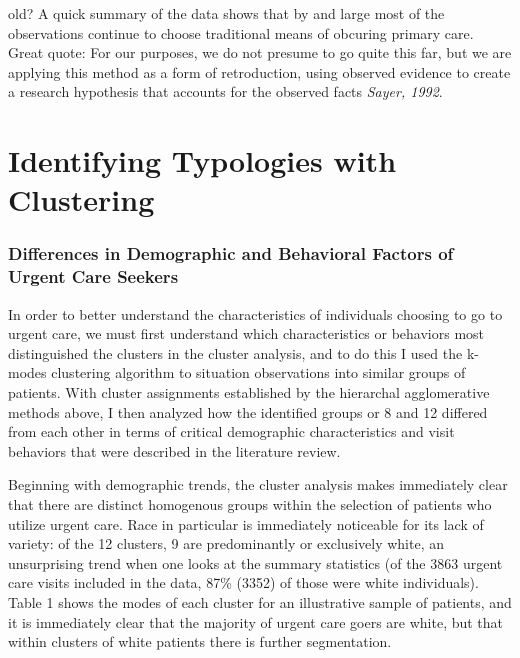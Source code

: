 \documentclass[12pt,twoside]{reedthesis}
\begin{document}
  old? A quick summary of the data shows that by and large most of the
  observations continue to choose traditional means of obcuring primary
  care. Great quote: For our purposes, we do not presume to go quite this
  far, but we are applying this method as a form of retroduction, using
  observed evidence to create a research hypothesis that accounts for the
  observed facts \emph{Sayer, 1992}.
  
  \section*{Identifying Typologies with
  Clustering}\label{identifying-typologies-with-clustering}
  
  \subsubsection*{Differences in Demographic and Behavioral Factors of
  Urgent Care
  Seekers}\label{differences-in-demographic-and-behavioral-factors-of-urgent-care-seekers}
  
  In order to better understand the characteristics of individuals
  choosing to go to urgent care, we must first understand which
  characteristics or behaviors most distinguished the clusters in the
  cluster analysis, and to do this I used the k-modes clustering algorithm
  to situation observations into similar groups of patients. With cluster
  assignments established by the hierarchal agglomerative methods above, I
  then analyzed how the identified groups or 8 and 12 differed from each
  other in terms of critical demographic characteristics and visit
  behaviors that were described in the literature review.
  
  Beginning with demographic trends, the cluster analysis makes
  immediately clear that there are distinct homogenous groups within the
  selection of patients who utilize urgent care. Race in particular is
  immediately noticeable for its lack of variety: of the 12 clusters, 9
  are predominantly or exclusively white, an unsurprising trend when one
  looks at the summary statistics (of the 3863 urgent care visits included
  in the data, 87\% (3352) of those were white individuals). Table 1 shows
  the modes of each cluster for an illustrative sample of patients, and it
  is immediately clear that the majority of urgent care goers are white,
  but that within clusters of white patients there is further
  segmentation.
  
\end{document}
